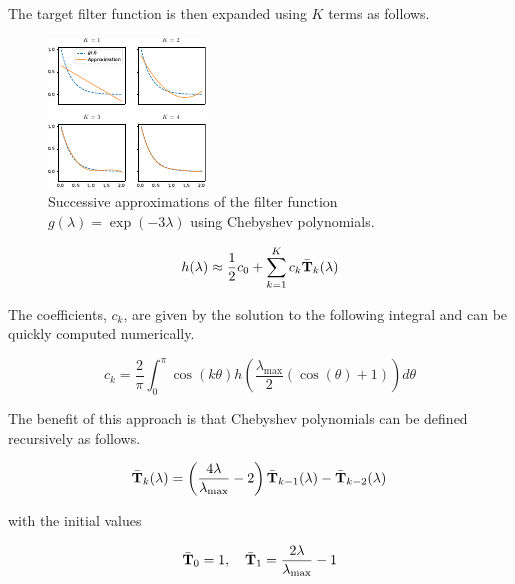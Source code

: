 The target filter function is then expanded using $K$ terms as follows. 

\begin{figure}[t]
	\centering
		\includegraphics[width=0.7\linewidth]{Figures/cheb.pdf}
	\caption[Successive approximations of a filter function using Chebyshev polynomials.]{Successive approximations of the filter function $g(\lambda) = \exp(-3\lambda)$ using Chebyshev polynomials. }
	\label{fig:Chebyshev}
\end{figure}


\begin{equation}
    h(\lambda) \approx \frac{1}{2} c_0 + \sum_{k=1}^K c_k \bar{\mathbf{T}}_k(\lambda)
\end{equation}

The coefficients, $c_k$, are given by the solution to the following integral and can be quickly computed numerically. 

\begin{equation}
    c_k = \frac{2}{\pi} \int_{0}^{\pi} \cos(k \theta) h\left(\frac{\lambda_{\text{max}}}{2} (\cos(\theta) + 1)\right) d\theta
\end{equation}

The benefit of this approach is that Chebyshev polynomials can be defined recursively as follows. 

\begin{equation}
    \bar{\mathbf{T}}_k(\lambda) = \left(\frac{4 \lambda }{\lambda_{\text{max}}}  - 2\right) \bar{\mathbf{T}}_{k-1}(\lambda) - \bar{\mathbf{T}}_{k-2}(\lambda)
\end{equation}

with the initial values

\begin{equation}
    \bar{\mathbf{T}}_0 = 1, \quad \bar{\mathbf{T}}_1 = \frac{2 \lambda }{\lambda_{\text{max}}} - 1
\end{equation}

